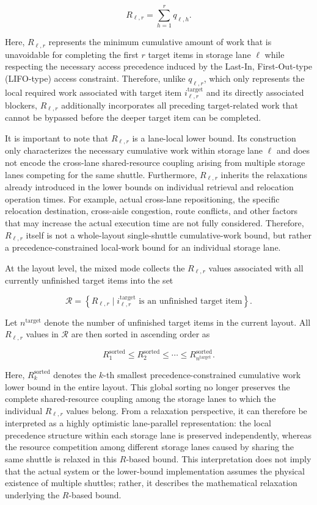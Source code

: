 \[
R_{\ell,r}
=
\sum_{h=1}^{r}
q_{\ell,h}.
\]

Here, \(R_{\ell,r}\) represents the minimum cumulative amount of work that is
unavoidable for completing the first \(r\) target items in storage lane
\(\ell\) while respecting the necessary access precedence induced by the
Last-In, First-Out-type (LIFO-type) access constraint. Therefore, unlike
\(q_{\ell,r}\), which only represents the local required work associated with
target item \(i^{\mathrm{target}}_{\ell,r}\) and its directly associated
blockers, \(R_{\ell,r}\) additionally incorporates all preceding
target-related work that cannot be bypassed before the deeper target item can
be completed.

It is important to note that \(R_{\ell,r}\) is a lane-local lower bound. Its
construction only characterizes the necessary cumulative work within storage
lane \(\ell\) and does not encode the cross-lane shared-resource coupling
arising from multiple storage lanes competing for the same shuttle.
Furthermore, \(R_{\ell,r}\) inherits the relaxations already introduced in the
lower bounds on individual retrieval and relocation operation times. For
example, actual cross-lane repositioning, the specific relocation destination,
cross-aisle congestion, route conflicts, and other factors that may increase
the actual execution time are not fully considered. Therefore,
\(R_{\ell,r}\) itself is not a whole-layout single-shuttle cumulative-work
bound, but rather a precedence-constrained local-work bound for an individual
storage lane.

At the layout level, the mixed mode collects the \(R_{\ell,r}\) values
associated with all currently unfinished target items into the set

\[
\mathcal{R}
=
\left\{
R_{\ell,r}
\mid
i^{\mathrm{target}}_{\ell,r}
\text{ is an unfinished target item}
\right\}.
\]

Let \(n^{\mathrm{target}}\) denote the number of unfinished target items in the
current layout. All \(R_{\ell,r}\) values in \(\mathcal{R}\) are then sorted in
ascending order as

\[
R_1^{\mathrm{sorted}}
\leq
R_2^{\mathrm{sorted}}
\leq
\cdots
\leq
R_{n^{\mathrm{target}}}^{\mathrm{sorted}}.
\]

Here, \(R_k^{\mathrm{sorted}}\) denotes the \(k\)-th smallest
precedence-constrained cumulative work lower bound in the entire layout. This
global sorting no longer preserves the complete shared-resource coupling among
the storage lanes to which the individual \(R_{\ell,r}\) values belong. From a
relaxation perspective, it can therefore be interpreted as a highly optimistic
lane-parallel representation: the local precedence structure within each
storage lane is preserved independently, whereas the resource competition
among different storage lanes caused by sharing the same shuttle is relaxed in
this \(R\)-based bound. This interpretation does not imply that the actual
system or the lower-bound implementation assumes the physical existence of
multiple shuttles; rather, it describes the mathematical relaxation underlying
the \(R\)-based bound.

